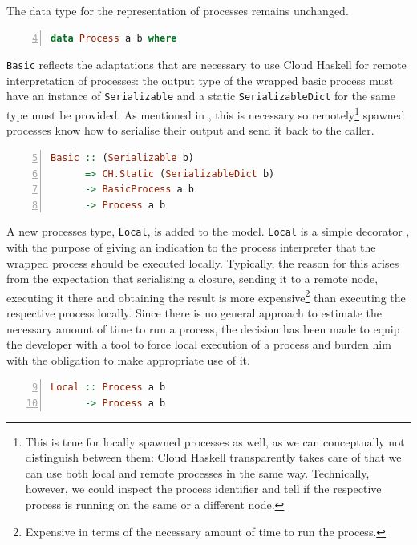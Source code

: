 The data type for the representation of processes remains unchanged.
\begin{lstlisting}[language=Haskell,caption=Data type for the representation of processes.,label=fig:distributed_datatypes,numbers=left,frame=bt,firstnumber=4]
data Process a b where
\end{lstlisting}

\texttt{Basic} reflects the adaptations that are necessary to use \textsf{Cloud Haskell} for remote interpretation of processes: the output type of the wrapped basic process must have an instance of \texttt{Serializable} and a static \texttt{SerializableDict} for the same type must be provided. As mentioned in , this is necessary so remotely\footnote{This is true for locally spawned processes as well, as we can conceptually not distinguish between them: \textsf{Cloud Haskell} transparently takes care of that we can use both local and remote processes in the same way. Technically, however, we could inspect the process identifier and tell if the respective process is running on the same or a different node.} spawned processes know how to serialise their output and send it back to the caller.
\begin{lstlisting}[language=Haskell,caption=Signature of the \texttt{Const} and \texttt{Simple} data constructors.,numbers=left,frame=bt,firstnumber=5]
Basic :: (Serializable b)
      => CH.Static (SerializableDict b)
      -> BasicProcess a b
      -> Process a b
\end{lstlisting}

A new processes type, \texttt{Local}, is added to the model. \texttt{Local} is a simple decorator \cite{Gamma:1995:DPE:186897}, with the purpose of giving an indication to the process interpreter that the wrapped process should be executed locally. Typically, the reason for this arises from the expectation that serialising a closure, sending it to a remote node, executing it there and obtaining the result is more expensive\footnote{Expensive in terms of the necessary amount of time to run the process.} than executing the respective process locally. Since there is no general approach to estimate the necessary amount of time to run a process, the decision has been made to equip the developer with a tool to force local execution of a process and burden him with the obligation to make appropriate use of it.
\begin{lstlisting}[language=Haskell,caption=Signature of the additional \texttt{Local} data constructor.,numbers=left,frame=bt,firstnumber=9]
Local :: Process a b
      -> Process a b
\end{lstlisting}

